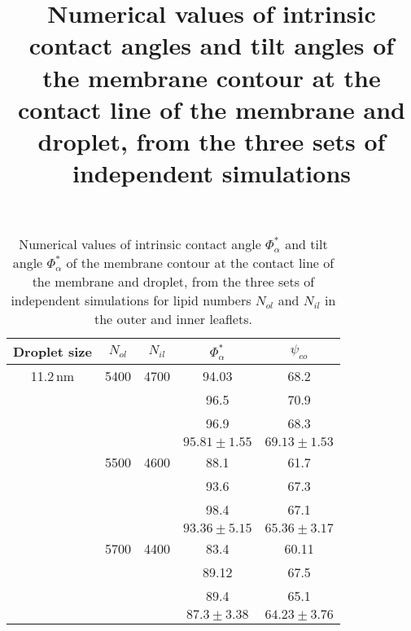 \documentclass{article}
\title{Numerical  values of intrinsic contact angles and tilt angles of the membrane contour at the contact line of the membrane and droplet, from the three sets of independent simulations}
\begin{document}
\maketitle

\newpage

\begin{table}
    \centering
    \caption{Numerical  values of intrinsic contact angle $\Phi_{\alpha}^*$ and tilt angle $\Phi_{\alpha}^*$ of the membrane contour at the contact line of the membrane and droplet, from the three sets of independent simulations for lipid numbers $N_{ol}$ and $N_{il}$ in the outer and inner leaflets.}
    \begin{tabular}{|c|c|c|c|c|}
    \hline
     Droplet size  & $N_{ol}$ & $N_{il}$   & $\Phi_{\alpha}^*$ & $\psi_{co}$\\
     \hline
      11.2\,nm & 5400    &  4700      &  94.03       &   68.2  \\
               &         &            &  96.5        &   70.9  \\
               &         &            &  96.9        &   68.3  \\
  \hline
               &          &           & $95.81 \pm 1.55$ &  $69.13 \pm 1.53$  \\
  \hline
              
               & 5500    &  4600      & 88.1         &   61.7   \\
               &         &            & 93.6         &   67.3   \\
               &         &            & 98.4         &  67.1    \\
    \hline
               &         &  & $93.36 \pm 5.15$  & $65.36 \pm 3.17$ \\
    \hline
              &  5700    &  4400      & 83.4      &    60.11  \\
              &          &            & 89.12     &    67.5   \\
              &          &            & 89.4      &    65.1   \\
    \hline
              &          &            & $87.3 \pm 3.38$        &  $64.23 \pm 3.76$ \\
    \hline


\end{tabular}
\end{table}
\end{document}
